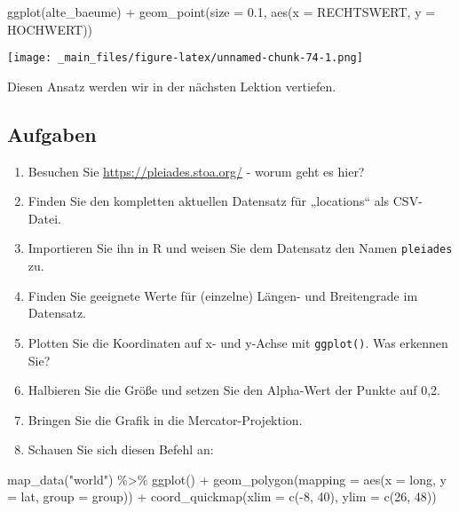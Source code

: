 \documentclass[11pt,german,a4paper]{article}
\newenvironment{Shaded}{\begin{snugshade}}{\end{snugshade}}
\newcommand{\AttributeTok}[1]{\textcolor[rgb]{0.77,0.63,0.00}{#1}}
\newcommand{\DecValTok}[1]{\textcolor[rgb]{0.00,0.00,0.81}{#1}}
\newcommand{\FloatTok}[1]{\textcolor[rgb]{0.00,0.00,0.81}{#1}}
\newcommand{\FunctionTok}[1]{\textcolor[rgb]{0.00,0.00,0.00}{#1}}
\newcommand{\NormalTok}[1]{#1}
\newcommand{\SpecialCharTok}[1]{\textcolor[rgb]{0.00,0.00,0.00}{#1}}
\newcommand{\StringTok}[1]{\textcolor[rgb]{0.31,0.60,0.02}{#1}}
\begin{document}
\begin{Shaded}
\begin{Highlighting}[]
\FunctionTok{ggplot}\NormalTok{(alte\_baeume) }\SpecialCharTok{+}
    \FunctionTok{geom\_point}\NormalTok{(}\AttributeTok{size =} \FloatTok{0.1}\NormalTok{, }\FunctionTok{aes}\NormalTok{(}\AttributeTok{x =}\NormalTok{ RECHTSWERT, }\AttributeTok{y =}\NormalTok{ HOCHWERT))}
\end{Highlighting}
\end{Shaded}

\texttt{[image: \_main\_files/figure-latex/unnamed-chunk-74-1.png]}

Diesen Ansatz werden wir in der nächsten Lektion vertiefen.

\hypertarget{aufgaben-3}{%
\subsection{Aufgaben}\label{aufgaben-3}}

\begin{enumerate}
\def\labelenumi{\arabic{enumi}.}
\item
  Besuchen Sie \url{https://pleiades.stoa.org/} - worum geht es hier?
\item
  Finden Sie den kompletten aktuellen Datensatz für „locations`` als CSV-Datei.
\item
  Importieren Sie ihn in R und weisen Sie dem Datensatz den Namen \texttt{pleiades} zu.
\item
  Finden Sie geeignete Werte für (einzelne) Längen- und Breitengrade im Datensatz.
\item
  Plotten Sie die Koordinaten auf x- und y-Achse mit \texttt{ggplot()}. Was erkennen Sie?
\item
  Halbieren Sie die Größe und setzen Sie den Alpha-Wert der Punkte auf 0,2.
\item
  Bringen Sie die Grafik in die Mercator-Projektion.
\item
  Schauen Sie sich diesen Befehl an:
\end{enumerate}

\begin{Shaded}
\begin{Highlighting}[]
\FunctionTok{map\_data}\NormalTok{(}\StringTok{"world"}\NormalTok{) }\SpecialCharTok{\%\textgreater{}\%}
  \FunctionTok{ggplot}\NormalTok{() }\SpecialCharTok{+}
    \FunctionTok{geom\_polygon}\NormalTok{(}\AttributeTok{mapping =} \FunctionTok{aes}\NormalTok{(}\AttributeTok{x =}\NormalTok{ long,}
                               \AttributeTok{y =}\NormalTok{ lat,}
                               \AttributeTok{group =}\NormalTok{ group)) }\SpecialCharTok{+}
    \FunctionTok{coord\_quickmap}\NormalTok{(}\AttributeTok{xlim =} \FunctionTok{c}\NormalTok{(}\SpecialCharTok{{-}}\DecValTok{8}\NormalTok{, }\DecValTok{40}\NormalTok{),}
                   \AttributeTok{ylim =} \FunctionTok{c}\NormalTok{(}\DecValTok{26}\NormalTok{, }\DecValTok{48}\NormalTok{))}
\end{Highlighting}
\end{Shaded}
\end{document}
